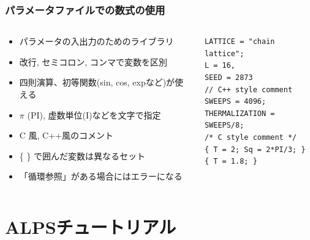 \begin{frame}[t,fragile]
  \frametitle{パラメータファイルでの数式の使用}
  \begin{columns}[T]
    \begin{column}{.5\textwidth}
      \begin{itemize}
      \item パラメータの入出力のためのライブラリ
        \item 改行, セミコロン, コンマで変数を区別
        \item 四則演算、初等関数(sin, cos, expなど)が使える
        \item $\pi$ (PI), 虚数単位(I)などを文字で指定
        \item C 風, C++風のコメント
        \item \{ \} で囲んだ変数は異なるセット
        \item 「循環参照」がある場合にはエラーになる
      \end{itemize}
    \end{column}
    \begin{column}{.5\textwidth}
    \begin{lstlisting}
LATTICE = "chain lattice";
L = 16,
SEED = 2873
// C++ style comment
SWEEPS = 4096;
THERMALIZATION = SWEEPS/8;
/* C style comment */
{ T = 2; Sq = 2*PI/3; }
{ T = 1.8; }
    \end{lstlisting}
    \end{column}
  \end{columns}
\end{frame}

\section{ALPSチュートリアル}

